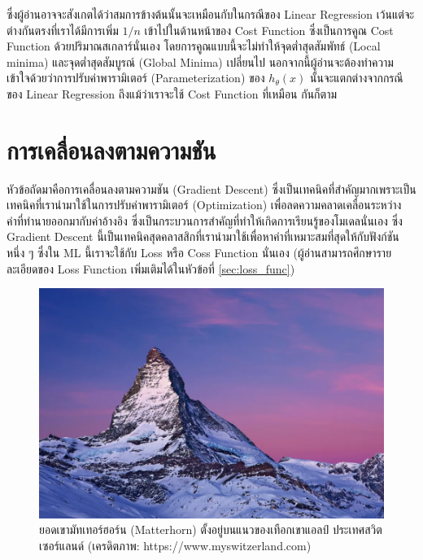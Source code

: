 \noindent ซึ่งผู้อ่านอาจจะสังเกตได้ว่าสมการข้างต้นนั้นจะเหมือนกับในกรณีของ Linear Regression เว้นแต่จะต่างกันตรงที่เราได้มีการเพิ่ม $1/n$
เข้าไปในด้านหน้าของ Cost Function ซึ่งเป็นการคูณ Cost Function ด้วยปริมาณสเกลาร์นั่นเอง โดยการคูณแบบนี้จะไม่ทำให้จุดต่ำสุดสัมพัทธ์
(Local minima) และจุดต่ำสุดสัมบูรณ์ (Global Minima) เปลี่ยนไป นอกจากนี้ผู้อ่านจะต้องทำความเข้าใจด้วยว่าการปรับค่าพารามิเตอร์
(Parameterization) ของ $h_\theta(x)$ นั้นจะแตกต่างจากกรณีของ Linear Regression ถึงแม้ว่าเราจะใช้ Cost Function ที่เหมือน%
กันก็ตาม

\section{การเคลื่อนลงตามความชัน}
\label{sec:gradient_descent}

หัวข้อถัดมาคือการเคลื่อนลงตามความชัน (Gradient Descent) ซึ่งเป็นเทคนิคที่สำคัญมากเพราะเป็นเทคนิคที่เรานำมาใช้ในการปรับค่าพารามิเตอร์
(Optimization) เพื่อลดความคลาดเคลื่อนระหว่างค่าที่ทำนายออกมากับค่าอ้างอิง ซึ่งเป็นกระบวนการสำคัญที่ทำให้เกิดการเรียนรู้ของโมเดลนั่นเอง
ซึ่ง Gradient Descent นี้เป็นเทคนิคสุดคลาสสิกที่เรานำมาใช้เพื่อหาค่าที่เหมาะสมที่สุดให้กับฟังก์ชันหนึ่ง ๆ ซึ่งใน ML นี้เราจะใช้กับ Loss หรือ
Coss Function นั่นเอง (ผู้อ่านสามารถศึกษารายละเอียดของ Loss Function เพิ่มเติมได้ในหัวข้อที่ \ref{sec:loss_func})

\begin{figure}[H]
    \centering
    \includegraphics[width=0.8\linewidth]{fig/matterhorn.png}
    \caption{ยอดเขามัทเทอร์ฮอร์น (Matterhorn) ตั้งอยู่บนแนวของเทือกเขาแอลป์ ประเทศสวิตเซอร์แลนด์
        (เครดิตภาพ: https://www.myswitzerland.com)}
    \label{fig:matterhorn}
\end{figure}

